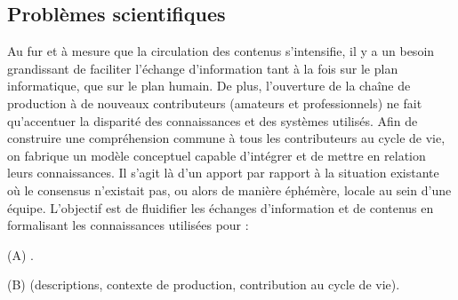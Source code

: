 \begin{liste}
\end{liste}



\subsection{Problèmes scientifiques}\label{sec:scien}
Au fur et à mesure que la circulation des contenus s'intensifie, il y a un besoin grandissant de faciliter l'échange d'information tant à la fois sur le plan informatique, que sur le plan humain. 
De plus, l'ouverture de la chaîne de production à de nouveaux contributeurs (amateurs et professionnels) ne fait qu'accentuer la disparité des connaissances et des systèmes utilisés. 
Afin de construire une compréhension commune à tous les contributeurs au cycle de vie, on fabrique un modèle conceptuel capable d'intégrer et de mettre en relation leurs connaissances. 
Il s'agit là d'un apport par rapport à la situation existante où le consensus n'existait pas, ou alors de manière éphémère, locale au sein d'une équipe.
L'objectif est de fluidifier les échanges d'information et de contenus en formalisant les connaissances utilisées pour :
\begin{liste}
	\item[(A)] .
	\item[(B)]  (descriptions, contexte de production, contribution au cycle de vie).
\end{liste}

